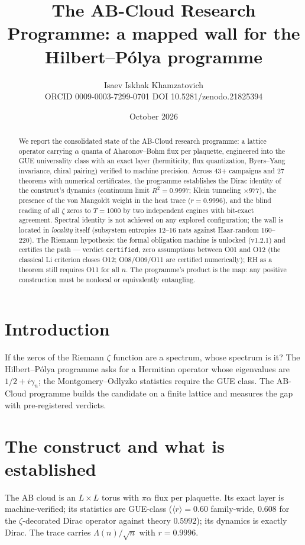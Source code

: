 \documentclass[11pt,a4paper]{article}
\title{The AB-Cloud Research Programme: a mapped wall for the
Hilbert--P\'olya programme}
\author{Isaev Iskhak Khamzatovich\\
ORCID 0009-0003-7299-0701 \textbullet{}
DOI 10.5281/zenodo.21825394}
\date{October 2026}
\begin{document}
\maketitle

\begin{abstract}
We report the consolidated state of the AB-Cloud research programme: a
lattice operator carrying $\alpha$ quanta of Aharonov--Bohm flux per
plaquette, engineered into the GUE universality class with an exact layer
(hermiticity, flux quantization, Byers--Yang invariance, chiral pairing)
verified to machine precision. Across 43+ campaigns and 27 theorems with
numerical certificates, the programme establishes the Dirac identity of the
construct's dynamics (continuum limit $R^2 = 0.9997$; Klein tunneling $\times
977$), the presence of the von Mangoldt weight in the heat trace ($r =
0.9996$), and the blind reading of all $\zeta$ zeros to $T = 1000$ by two
independent engines with bit-exact agreement. Spectral identity is not
achieved on any explored configuration; the wall is located in
\emph{locality} itself (subsystem entropies 12--16 nats against Haar-random
160--220). The Riemann hypothesis: the formal obligation machine is
unlocked (v1.2.1) and certifies the path --- verdict \texttt{certified},
zero assumptions between O01 and O12 (the classical Li criterion closes
O12; O08/O09/O11 are certified numerically); RH as a theorem still
requires O11 for all $n$. The programme's
product is the map: any positive construction must be nonlocal or
equivalently entangling.
\end{abstract}

\section{Introduction}
If the zeros of the Riemann $\zeta$ function are a spectrum, whose spectrum
is it? The Hilbert--P\'olya programme asks for a Hermitian operator whose
eigenvalues are $1/2 + i\gamma_n$; the Montgomery--Odlyzko statistics
require the GUE class. The AB-Cloud programme builds the candidate on a
finite lattice and measures the gap with pre-registered verdicts.

\section{The construct and what is established}
The AB cloud is an $L\times L$ torus with $\pi\alpha$ flux per plaquette.
Its exact layer is machine-verified; its statistics are GUE-class
($\langle r\rangle = 0.60$ family-wide, $0.608$ for the $\zeta$-decorated
Dirac operator against theory $0.5992$); its dynamics is exactly Dirac.
The trace carries $\Lambda(n)/\sqrt{n}$ with $r = 0.9996$.
\end{document}
